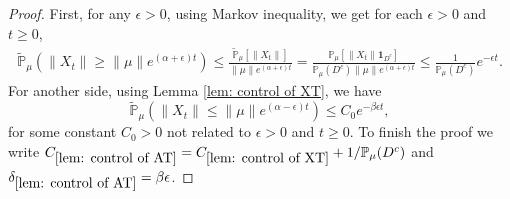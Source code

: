 \documentclass[12pt,oneside,english]{amsart}
\theoremstyle{plain}
\theoremstyle{definition}
\numberwithin{equation}{section}
\newcommand{\added}[1]{{\color{blue}#1}}\newcommand{\deleted}[1]{{\color{red}#1}}
\begin{document}
\begin{proof}
    First, for any $\epsilon>0$, using Markov inequality, \added{we get for each $\epsilon>0$ and $t\geq 0$,}
\added{
\begin{align}
    \mathbb{\tilde{P}}_{\mu}(\|X_t\|\geq\|\mu\|e^{(\alpha+\epsilon)t})
    \leq\frac{\mathbb{\tilde{P}}_{\mu}[\|X_t\|]}{\|\mu\|e^{(\alpha+\epsilon)t}}
	= \frac{\mathbb P_\mu[\|X_t\|\mathbf 1_{D^c}]}{\mathbb P_\mu(D^c)\|\mu\|e^{(\alpha+\epsilon)t}}
    \leq \frac{1}{\mathbb{P}_{\mu}(D^c)}e^{-\epsilon t}.
\end{align}
}
    For another side, using Lemma \ref{lem: control of XT}, we have
    $$\mathbb{\tilde{P}}_{\mu}\left(\|X_t\|\leq \|\mu\|e^{(\alpha-\epsilon)t}\right)\leq C_0 e^{-\beta\epsilon t}, $$
    \added{for some constant $C_0>0$ not related to $\epsilon>0$ and $t\geq 0$.}
\deleted{To finish the proof we write $C_{\ref{lem: control of AT}}=C_{\ref{lem: control of XT}}+1/\mathbb{P}_{\mu}(D^c)$ and $\delta_{\ref{lem: control of AT}}=\beta\epsilon $.}
\begin{comment}
\begin{align*}
    \mathbb{\tilde{P}}_{\mu}\left(\mathcal{A}_t(\epsilon)^c\right)\leq \mathbb{\tilde{P}}_{\mu}(\|X_t\|\geq\|\mu\|e^{(\alpha+\epsilon)t})+\mathbb{P}_{\mu}\left(\|X_t\|\leq \|\mu\|e^{(\alpha-\epsilon)t}\right)\leq(C_4+\frac{1}{\mathbb{P}_{\mu}(D^c)})e^{-\beta \epsilon t }
\end{align*}
\end{comment}
\end{proof}

\end{document}
